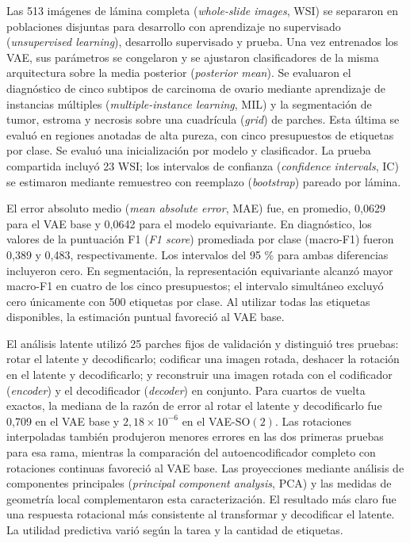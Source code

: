 Las 513 imágenes de lámina completa (\emph{whole-slide images}, WSI) se separaron en poblaciones disjuntas para
desarrollo con aprendizaje no supervisado (\emph{unsupervised learning}),
desarrollo supervisado y prueba. Una vez entrenados los VAE,
sus parámetros se congelaron y se ajustaron clasificadores de la misma arquitectura
sobre la media posterior (\emph{posterior mean}). Se evaluaron el diagnóstico de cinco subtipos de carcinoma de
ovario mediante aprendizaje de instancias múltiples (\emph{multiple-instance learning}, MIL) y la segmentación de tumor, estroma
y necrosis sobre una cuadrícula (\emph{grid}) de parches. Esta última se evaluó en regiones anotadas
de alta pureza, con cinco presupuestos de etiquetas por clase. Se evaluó una
inicialización por modelo y clasificador. La prueba compartida incluyó 23 WSI; los
intervalos de confianza (\emph{confidence intervals}, IC) se estimaron mediante remuestreo con reemplazo (\emph{bootstrap}) pareado por lámina.

\begin{samepage}
El error absoluto medio (\emph{mean absolute error}, MAE) fue, en promedio,
0,0629 para el VAE base y 0,0642 para el modelo equivariante. En
diagnóstico, los valores de la puntuación F1 (\emph{F1 score}) promediada por clase
(macro-F1) fueron 0,389 y 0,483, respectivamente. Los
intervalos del 95 \% para ambas diferencias incluyeron cero. En segmentación, la
representación equivariante alcanzó mayor macro-F1 en cuatro de los cinco presupuestos;
el intervalo simultáneo excluyó cero únicamente con 500 etiquetas por clase. Al utilizar
todas las etiquetas disponibles, la estimación puntual favoreció al VAE base.
\par\end{samepage}

El análisis latente utilizó 25 parches fijos de validación y distinguió tres
pruebas: rotar el latente y decodificarlo; codificar una imagen rotada, deshacer
la rotación en el latente y decodificarlo; y reconstruir una imagen rotada con
el codificador (\emph{encoder}) y el decodificador (\emph{decoder}) en conjunto. Para cuartos de vuelta exactos,
la mediana de la razón de error al rotar el latente y decodificarlo fue 0,709
en el VAE base y \(2,18\times10^{-6}\) en el VAE-\(\mathrm{SO}(2)\).
Las rotaciones interpoladas también produjeron menores errores en las dos
primeras pruebas para esa rama, mientras la comparación del autoencodificador
completo con rotaciones continuas favoreció al VAE base. Las proyecciones mediante
análisis de componentes principales (\emph{principal component analysis}, PCA)
y las medidas de geometría local complementaron esta
caracterización. El resultado más claro fue una respuesta rotacional más consistente al
transformar y decodificar el latente. La utilidad predictiva varió según la tarea y la
cantidad de etiquetas.
\endgroup

